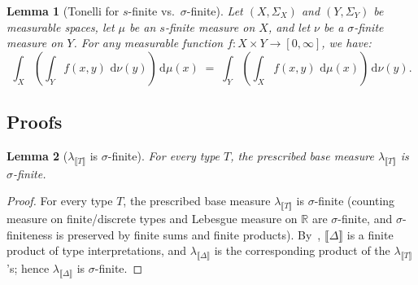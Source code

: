 \documentclass[preprint]{uai2026} %
\newtheorem{lemma}{Lemma}
\newcommand{\RR}{\mathbb{R}}
\newcommand{\sem}[1]{\llbracket #1 \rrbracket}
\newcommand{\dd}{\,\mathrm{d}}
\begin{document}
\begin{lemma}[Tonelli for $s$-finite vs.\ $\sigma$-finite]\label{lem:tonelli-sfinite}
Let $(X,\Sigma_X)$ and $(Y,\Sigma_Y)$ be measurable spaces, let $\mu$ be an $s$-finite measure on $X$,
and let $\nu$ be a $\sigma$-finite measure on $Y$. For any measurable function
$f : X\times Y \to [0,\infty]$, we have:
\[
\int_X \left(\int_Y f(x,y)\, \dd\nu(y)\right) \dd\mu(x)
\;=\;
\int_Y \left(\int_X f(x,y)\, \dd\mu(x)\right) \dd\nu(y).
\]
\end{lemma}

\subsection{Proofs}

\printProofs

\begin{lemma}[$\lambda_{\sem{T}}$ is $\sigma$-finite]
    For every type $T$, the prescribed base measure $\lambda_{\sem{T}}$ is $\sigma$-finite.
\end{lemma}
\begin{proof}
For every type $T$, the prescribed base measure $\lambda_{\sem{T}}$ is $\sigma$-finite
(counting measure on finite/discrete types and Lebesgue measure on $\RR$ are $\sigma$-finite, and
$\sigma$-finiteness is preserved by finite sums and finite products).
By~, $\sem{\Delta}$ is a finite product of type interpretations, and
$\lambda_{\sem{\Delta}}$ is the corresponding product of the $\lambda_{\sem{T}}$'s; hence
$\lambda_{\sem{\Delta}}$ is $\sigma$-finite.    
\end{proof}
\end{document}
